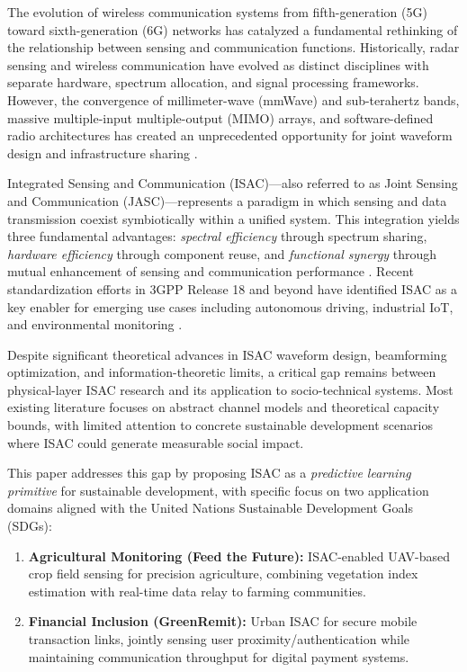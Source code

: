 \documentclass[conference]{IEEEtran}
\begin{document}
The evolution of wireless communication systems from fifth-generation (5G) toward sixth-generation (6G) networks has catalyzed a fundamental rethinking of the relationship between sensing and communication functions. Historically, radar sensing and wireless communication have evolved as distinct disciplines with separate hardware, spectrum allocation, and signal processing frameworks. However, the convergence of millimeter-wave (mmWave) and sub-terahertz bands, massive multiple-input multiple-output (MIMO) arrays, and software-defined radio architectures has created an unprecedented opportunity for joint waveform design and infrastructure sharing \cite{liu2022isac,zhang2021isac}.

Integrated Sensing and Communication (ISAC)---also referred to as Joint Sensing and Communication (JASC)---represents a paradigm in which sensing and data transmission coexist symbiotically within a unified system. This integration yields three fundamental advantages: \textit{spectral efficiency} through spectrum sharing, \textit{hardware efficiency} through component reuse, and \textit{functional synergy} through mutual enhancement of sensing and communication performance \cite{wei2021waveform}. Recent standardization efforts in 3GPP Release 18 and beyond have identified ISAC as a key enabler for emerging use cases including autonomous driving, industrial IoT, and environmental monitoring \cite{3gpp2023isac}.

Despite significant theoretical advances in ISAC waveform design, beamforming optimization, and information-theoretic limits, a critical gap remains between physical-layer ISAC research and its application to socio-technical systems. Most existing literature focuses on abstract channel models and theoretical capacity bounds, with limited attention to concrete sustainable development scenarios where ISAC could generate measurable social impact.

This paper addresses this gap by proposing ISAC as a \textit{predictive learning primitive} for sustainable development, with specific focus on two application domains aligned with the United Nations Sustainable Development Goals (SDGs):

\begin{enumerate}
    \item \textbf{Agricultural Monitoring (Feed the Future):} ISAC-enabled UAV-based crop field sensing for precision agriculture, combining vegetation index estimation with real-time data relay to farming communities.
    \item \textbf{Financial Inclusion (GreenRemit):} Urban ISAC for secure mobile transaction links, jointly sensing user proximity/authentication while maintaining communication throughput for digital payment systems.
\end{enumerate}
\end{document}
